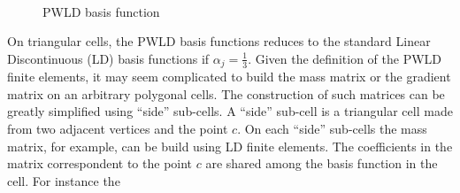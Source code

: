\begin{figure}[H]
\centering
{}
\\
\caption{PWLD basis function}
\label{pwld}
\end{figure}
On triangular cells, the PWLD basis functions reduces to the standard Linear
Discontinuous (LD) basis functions if $\alpha_j = \frac{1}{3}$. Given the 
definition of the PWLD finite elements, it may seem complicated to build the 
mass matrix or the gradient matrix on an arbitrary polygonal cells. The 
construction of such matrices can be greatly simplified using ``side'' sub-cells. 
A ``side'' sub-cell is a triangular cell made from two adjacent vertices and the 
point $c$. On each ``side'' sub-cells the mass matrix, for example, can be build
using LD finite elements. The coefficients in the matrix correspondent to the 
point $c$ are shared among the basis function in the cell. For instance the
